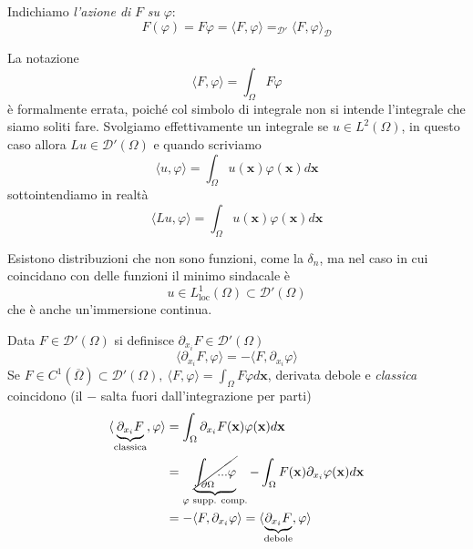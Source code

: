\documentclass[10pt,a4paper,twoside,openright]{book}
\newcommand{\x}{\mathbf{x}}
\begin{document}
Indichiamo \textit{l'azione di }$\displaystyle F$\textit{ su }$\displaystyle \varphi $:
\begin{equation*}
	F( \varphi ) =F\varphi =\langle F,\varphi \rangle =_{\mathcal{D} '} \langle F,\varphi \rangle _{\mathcal{D}}
\end{equation*}
\begin{nb}
	La notazione 
	\begin{equation*}
		\langle F,\varphi \rangle =\int _{\Omega } F\varphi 
	\end{equation*}
	è formalmente errata, poiché col simbolo di integrale non si intende l'integrale che siamo soliti fare. Svolgiamo effettivamente un integrale se $\displaystyle u\in L^{2}( \Omega )$, in questo caso allora $\displaystyle Lu\in \mathcal{D} '( \Omega )$ e quando scriviamo 
	\begin{equation*}
		\langle u,\varphi \rangle =\int _{\Omega } u(\x) \varphi (\x) d\x
	\end{equation*}
	sottointendiamo in realtà
	\begin{equation*}
		\langle Lu,\varphi \rangle =\int _{\Omega } u(\x) \varphi (\x) d\x
	\end{equation*}
\end{nb}
Esistono distribuzioni che non sono funzioni, come la $\displaystyle \delta _{n}$, ma nel caso in cui coincidano con delle funzioni il minimo sindacale è \ 
\begin{equation*}
	u\in L^{1}_{\text{loc}}( \Omega ) \subset \mathcal{D} '( \Omega )
\end{equation*}
che è anche un'immersione continua.
\begin{definition}
	 Data $\displaystyle F\in \mathcal{D}'( \Omega )$ si definisce $\displaystyle \partial _{x_{i}} F\in \mathcal{D} '( \Omega )$
	\begin{equation*}
		\langle \partial _{x_{i}} F,\varphi \rangle =-\langle F,\partial _{x_{i}} \varphi \rangle 
	\end{equation*}
	Se $\displaystyle F\in C^{1}(\overline{\Omega }) \subset \mathcal{D} '( \Omega ) ,\ \langle F,\varphi \rangle =\int _{\Omega } F\varphi d\x$, derivata debole e \textit{classica} coincidono (il $\displaystyle -$ salta fuori dall'integrazione per parti)
	\begin{align*}
		\langle \underbrace{\partial _{x_{i}} F}_{\text{classica}} ,\varphi \rangle & =\int _{\Omega } \partial _{x_{i}} F(\x) \varphi (\x) d\x                                                                              \\
		                                                                            & =\underbrace{\cancel{\int _{\partial \Omega } ...\varphi }}_{\varphi \text{ supp. comp.}} -\int _{\Omega } F(\x) \partial _{x_{i}} \varphi (\x)d\x \\
		                                                                            & =-\langle F,\partial _{x_{i}} \varphi\rangle =\langle \underbrace{\partial _{x_{i}} F}_{\text{debole}} ,\varphi \rangle                                              
	\end{align*}
\end{definition}
\end{document}
